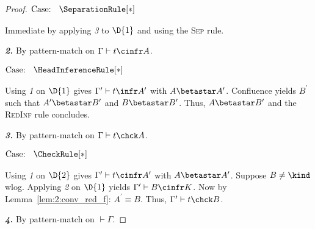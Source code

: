 \begin{proof}
    $\text{Case: }\begin{array}{c} \SeparationRule[*] \end{array}$
    \begin{proofcase}
        Immediate by applying \textit{3} to $\D{1}$ and using the \textsc{Sep} rule.
    \end{proofcase}

    \noindent \textbf{\textit{2.}} By pattern-match on $\Gamma \vdash t \cinfr A$.

    $\text{Case: }\begin{array}{c} \HeadInferenceRule[*] \end{array}$
    \begin{proofcase}
        Using \textit{1} on $\D{1}$ gives $\Gamma^\prime \vdash t \infr A^\prime$ with $A \betastar A^\prime$.
        Confluence yields $B^\prime$ such that $A^\prime \betastar B^\prime$ and $B \betastar B^\prime$.
        Thus, $A \betastar B^\prime$ and the \textsc{RedInf} rule concludes.
    \end{proofcase}

    \noindent \textbf{\textit{3.}} By pattern-match on $\Gamma \vdash t \chck A$.

    $\text{Case: }\begin{array}{c} \CheckRule[*] \end{array}$
    \begin{proofcase}
        Using \textit{1} on $\D{2}$ gives $\Gamma^\prime \vdash t \cinfr A^\prime$ with $A \betastar A^\prime$.
        Suppose $B \neq \kind$ wlog.
        Applying \textit{2} on $\D{1}$ yields $\Gamma^\prime \vdash B \cinfr K$.
        Now by Lemma~\ref{lem:2:conv_red_f}: $A^\prime \equiv B$.
        Thus, $\Gamma^\prime \vdash t \chck B$.
    \end{proofcase}

    \noindent \textbf{\textit{4.}} By pattern-match on $\vdash \Gamma$.


\end{proof}
